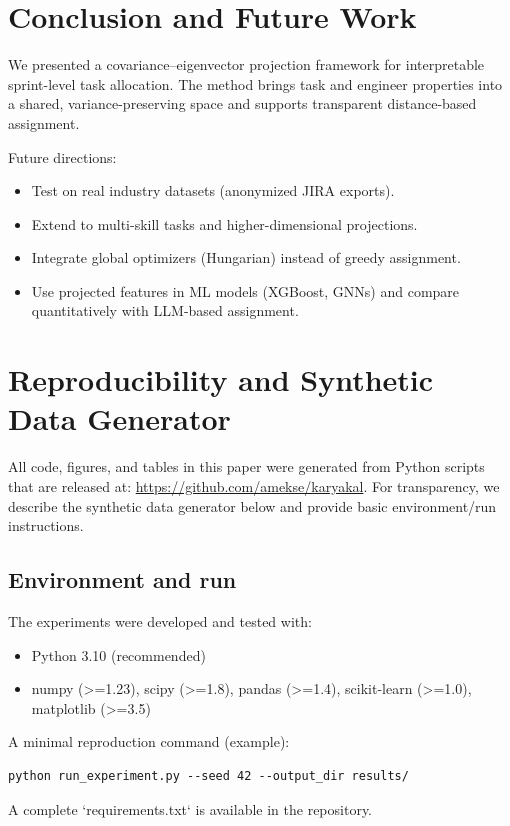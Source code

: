 \documentclass[journal]{IEEEtran}
\begin{document}
\section{Conclusion and Future Work}\label{sec:concl}
We presented a covariance--eigenvector projection framework for interpretable sprint-level task allocation. The method brings task and engineer properties into a shared, variance-preserving space and supports transparent distance-based assignment.

Future directions:
\begin{itemize}[leftmargin=*]
    \item Test on real industry datasets (anonymized JIRA exports).
    \item Extend to multi-skill tasks and higher-dimensional projections.
    \item Integrate global optimizers (Hungarian) instead of greedy assignment.
    \item Use projected features in ML models (XGBoost, GNNs) and compare quantitatively with LLM-based assignment.
\end{itemize}

\appendices
\section{Reproducibility and Synthetic Data Generator}
All code, figures, and tables in this paper were generated from Python scripts that are released at: 
\url{https://github.com/amekse/karyakal}.
For transparency, we describe the synthetic data generator below and provide basic environment/run instructions.

\subsection{Environment and run}
The experiments were developed and tested with:
\begin{itemize}[leftmargin=*]
    \item Python 3.10 (recommended)
    \item numpy (>=1.23), scipy (>=1.8), pandas (>=1.4), scikit-learn (>=1.0), matplotlib (>=3.5)
\end{itemize}

A minimal reproduction command (example):
\begin{verbatim}
python run_experiment.py --seed 42 --output_dir results/
\end{verbatim}
A complete `requirements.txt` is available in the repository.
\end{document}
